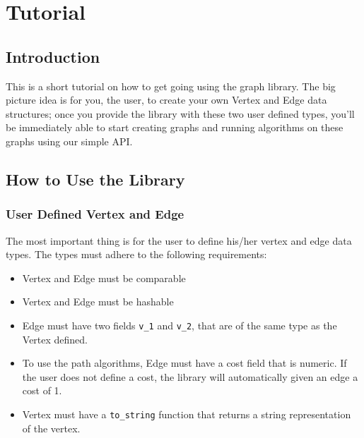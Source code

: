 \documentclass{article}
\begin{document}
\section{Tutorial}

\subsection{Introduction}
This is a short tutorial on how to get going using the graph library. The big picture idea is for you, the user, to create your own Vertex and Edge data structures; once you provide the library with these two user defined types, you'll be immediately able to start creating graphs and running algorithms on these graphs using our simple API.

\subsection{How to Use the Library}
\subsubsection{User Defined Vertex and Edge}
The most important thing is for the user to define his/her vertex and edge data types. The types must adhere to the following requirements:
\begin{itemize}
\item Vertex and Edge must be comparable
\item Vertex and Edge must be hashable
\item Edge must have two fields \texttt{v\_1} and \texttt{v\_2}, that are of the same type as the Vertex defined.
\item To use the path algorithms, Edge must have a cost field that is numeric. If the user does not define a cost, the library will automatically given an edge a cost of 1.
\item Vertex must have a \texttt{to\_string} function that returns a string representation of the vertex. 
\end{itemize}
\end{document}
